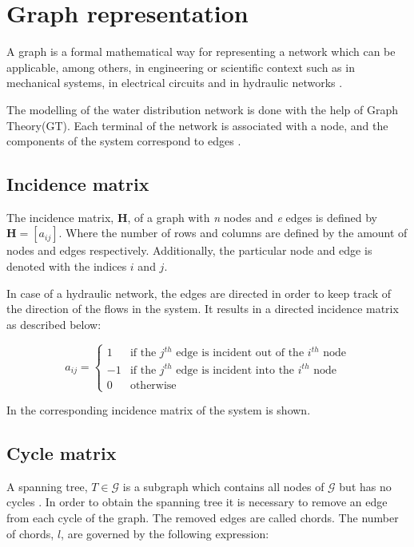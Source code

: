 \section{Graph representation}  
\label{GraphTheory}
A graph is a formal mathematical way for representing a network which can be applicable, among others, in engineering or scientific context such as in mechanical systems, in electrical circuits and in hydraulic networks \cite{graph_intro}. 

The modelling of the water distribution network is done with the help of Graph Theory(GT). Each terminal of the network is associated with a node, and the components of the system correspond to edges \cite{GraphTheoryCarsten}. 
\subsection{Incidence matrix} 
\label{IncidenceSection}
The incidence matrix, $\pmb{H}$, of a graph with \textit{n} nodes and \textit{e} edges is 
defined by $\pmb{H} = [a_{ij}]$. Where the number of rows and columns are defined by the amount of nodes and edges respectively. 
Additionally, the particular node and edge is denoted with the indices $i$ and 
$j$.

In case of a hydraulic network, the edges are directed in order to keep track of the direction of the flows in the system. It results in a directed incidence matrix as described below:

\begin{equation}
\label{DiGraph}
 a_{ij} =
		\left\{
		\begin{array}{ll}
		
		1 			&      \text{if the $j^{th}$ edge is incident out of the $i^{th}$ node}	
\\
		-1                       &     \text{if the $j^{th}$ edge is incident into the $i^{th}$ node}
\\


                0                       &      \text{otherwise}

		\end{array}
		\right.
\end{equation}	

In  the corresponding incidence matrix of the system is 
shown. 

\subsection{Cycle matrix}
\label{CycleSection}
A spanning tree, $T \in \mathcal{G}$ is a subgraph which contains all nodes of $\mathcal{G}$ but has no cycles \cite{GraphModel}. 
In order to obtain the spanning tree it is necessary to remove an edge from each cycle of the graph. The removed edges are called chords. The number of chords, $l$, are governed by the following expression:

